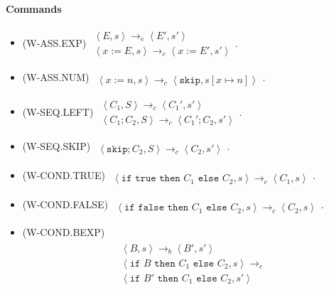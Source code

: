\documentclass[twocolumn,english]{article}
\begin{document}
\paragraph{Commands}
\begin{itemize}
\item {\scriptsize{}{}{}(W-ASS.EXP)} $\begin{array}{c}
\left\langle E,s\right\rangle \rightarrow_{e}\left\langle E',s'\right\rangle \\
\hline \left\langle x:=E,s\right\rangle \rightarrow_{c}\left\langle x:=E',s'\right\rangle 
\end{array}$. 
\item {\scriptsize{}{}{}(W-ASS.NUM)} $\begin{array}{c}
\\
\hline \left\langle x:=n,s\right\rangle \rightarrow_{c}\left\langle \texttt{skip},s\left[x\mapsto n\right]\right\rangle 
\end{array}$. 
\item {\scriptsize{}{}{}(W-SEQ.LEFT)} $\begin{array}{c}
\left\langle C_{1},S\right\rangle \rightarrow_{c}\left\langle C_{1}',s'\right\rangle \\
\hline \left\langle C_{1};C_{2},S\right\rangle \rightarrow_{c}\left\langle C_{1}';C_{2},s'\right\rangle 
\end{array}$. 
\item {\scriptsize{}{}{}(W-SEQ.SKIP)} $\begin{array}{c}
\\
\hline \left\langle \texttt{skip};C_{2},S\right\rangle \rightarrow_{c}\left\langle C_{2},s'\right\rangle 
\end{array}$. 
\item {\scriptsize{}{}{}(W-COND.TRUE)} $\begin{array}{c}
\\
\hline \left\langle \texttt{if true then }C_{1}\texttt{ else }C_{2},s\right\rangle \rightarrow_{c}\left\langle C_{1},s\right\rangle 
\end{array}$. 
\item {\scriptsize{}{}{}(W-COND.FALSE)} $\begin{array}{c}
\\
\hline \left\langle \texttt{if false then }C_{1}\texttt{ else }C_{2},s\right\rangle \rightarrow_{c}\left\langle C_{2},s\right\rangle 
\end{array}$. 
\item {\scriptsize{}{}{}(W-COND.BEXP)} 
\begin{multline*}
\begin{array}{c}
\left\langle B,s\right\rangle \rightarrow_{b}\left\langle B',s'\right\rangle \\
\hline \left\langle \texttt{if }B\texttt{ then }C_{1}\texttt{ else }C_{2},s\right\rangle \rightarrow_{c}\\
\left\langle \texttt{if }B'\texttt{ then }C_{1}\texttt{ else }C_{2},s'\right\rangle 
\end{array}
\end{multline*}


\end{itemize}
\end{document}
